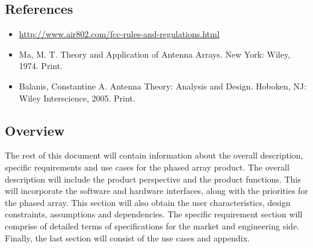 \documentclass[ProjectRequirements.tex]{subfiles}
\begin{document}
	\subsection{References}
		\begin{itemize}
			\item \url{http://www.air802.com/fcc-rules-and-regulations.html}
			\item Ma, M. T. Theory and Application of Antenna Arrays. New York: Wiley, 1974. Print.
			\item Balanis, Constantine A. Antenna Theory: Analysis and Design. Hoboken, NJ: Wiley Interscience, 2005. Print.
		\end{itemize}
	\subsection{Overview}
		The rest of this document will contain information about the overall description, specific requirements and use cases for the phased array product. The overall description will include the product perspective and the product functions. This will incorporate the software and hardware interfaces, along with the priorities for the phased array. This section will also obtain the user characteristics, design constraints, assumptions and dependencies. The specific requirement section will comprise of detailed terms of specifications for the market and engineering side. Finally, the last section will consist of the use cases and appendix.  
\end{document}
